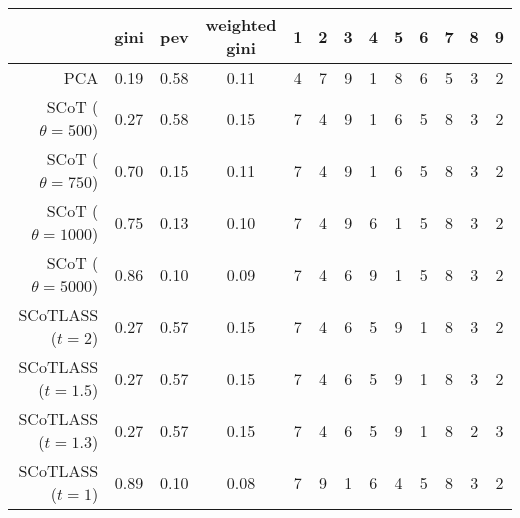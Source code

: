 \begin{tabular}{r|cccccccccccc}
\toprule
{} &  gini &  pev &  weighted gini &  1 &  2 &  3 &  4 &  5 &  6 &  7 &  8 &  9 \\
\midrule
PCA                    &  0.19 & 0.58 &           0.11 &  4 &  7 &  9 &  1 &  8 &  6 &  5 &  3 &  2 \\
SCoT ($\theta = 500$)  &  0.27 & 0.58 &           0.15 &  7 &  4 &  9 &  1 &  6 &  5 &  8 &  3 &  2 \\
SCoT ($\theta = 750$)  &  0.70 & 0.15 &           0.11 &  7 &  4 &  9 &  1 &  6 &  5 &  8 &  3 &  2 \\
SCoT ($\theta = 1000$) &  0.75 & 0.13 &           0.10 &  7 &  4 &  9 &  6 &  1 &  5 &  8 &  3 &  2 \\
SCoT ($\theta = 5000$) &  0.86 & 0.10 &           0.09 &  7 &  4 &  6 &  9 &  1 &  5 &  8 &  3 &  2 \\
SCoTLASS ($t = 2$)     &  0.27 & 0.57 &           0.15 &  7 &  4 &  6 &  5 &  9 &  1 &  8 &  3 &  2 \\
SCoTLASS ($t = 1.5$)   &  0.27 & 0.57 &           0.15 &  7 &  4 &  6 &  5 &  9 &  1 &  8 &  3 &  2 \\
SCoTLASS ($t = 1.3$)   &  0.27 & 0.57 &           0.15 &  7 &  4 &  6 &  5 &  9 &  1 &  8 &  2 &  3 \\
SCoTLASS ($t = 1$)     &  0.89 & 0.10 &           0.08 &  7 &  9 &  1 &  6 &  4 &  5 &  8 &  3 &  2 \\
\bottomrule
\end{tabular}
